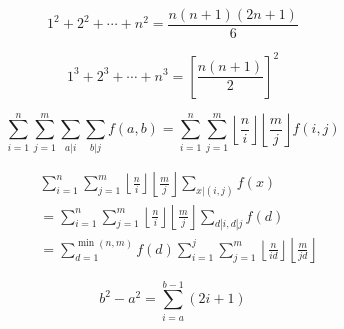 \begin{equation*}
1^2+2^2+\cdots+n^2=\frac{n(n+1)(2n+1)}{6}
\end{equation*}

\begin{equation*}
1^3+2^3+\cdots+n^3=\left[\frac{n(n+1)}{2}\right]^2
\end{equation*}

\begin{equation*}
\sum\limits_{i=1}^{n} \sum\limits_{j=1}^{m} \sum\limits_{a|i} \sum\limits_{b|j} f(a, b) = \sum\limits_{i=1}^{n} \sum\limits_{j=1}^{m} \left\lfloor \frac{n}{i} \right\rfloor \left\lfloor \frac{m}{j} \right\rfloor f(i, j) 
\end{equation*}

\begin{equation*}
\begin{aligned}
& \sum\limits_{i=1}^{n} \sum\limits_{j=1}^{m} \left\lfloor \frac{n}{i} \right\rfloor \left\lfloor \frac{m}{j} \right\rfloor \sum\limits_{x|(i, j)} f(x) \\
& = \sum\limits_{i=1}^{n} \sum\limits_{j=1}^{m} \left\lfloor \frac{n}{i} \right\rfloor \left\lfloor \frac{m}{j} \right\rfloor \sum\limits_{d | i, d | j} f(d) \\
& = \sum\limits_{d=1}^{\min(n, m)} f(d)  \sum\limits_{i=1}^{j} \sum\limits_{j=1}^{m} \left\lfloor \frac{n}{id} \right\rfloor 
\left\lfloor \frac{m}{jd} \right\rfloor
\end{aligned}
\end{equation*}

\begin{equation*}
b^2 - a^2 = \sum_{i=a}^{b-1}(2i+1)
\end{equation*}
